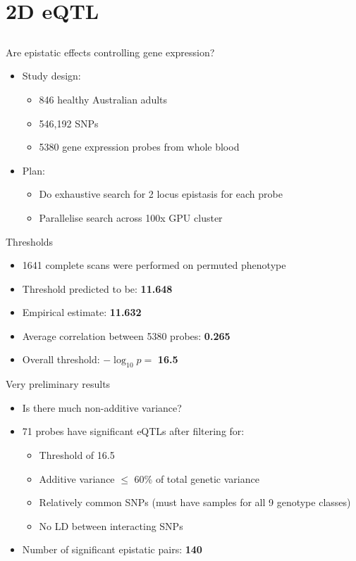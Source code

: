 \documentclass{beamer}
\begin{document}
\section{2D eQTL}
\subsection{}

\begin{frame}{Are epistatic effects controlling gene expression?}
\begin{itemize}
\item Study design:
\begin{itemize}
\item 846 healthy Australian adults
\item 546,192 SNPs
\item 5380 gene expression probes from whole blood
\end{itemize}
\item Plan:
\begin{itemize}
\item Do exhaustive search for 2 locus epistasis for each probe
\item Parallelise search across 100x GPU cluster
\end{itemize}
\end{itemize}
\end{frame}

\begin{frame}{Thresholds}
\begin{itemize}
\item 1641 complete scans were performed on permuted phenotype
\item Threshold predicted to be: \textbf{11.648}
\item Empirical estimate: \textbf{11.632}
\item Average correlation between 5380 probes: \textbf{0.265}
\item Overall threshold: $-\log_{10}p =$ \textbf{16.5}
\end{itemize}
\end{frame}

\begin{frame}{Very preliminary results}
\begin{itemize}
\item Is there much non-additive variance?
\item 71 probes have significant eQTLs after filtering for:
\begin{itemize}
\item Threshold of 16.5
\item Additive variance $\leq$ 60\% of total genetic variance
\item Relatively common SNPs (must have samples for all 9 genotype classes)
\item No LD between interacting SNPs
\end{itemize}
\item Number of significant epistatic pairs: \textbf{140}
\end{itemize}
\end{frame}
\end{document}
